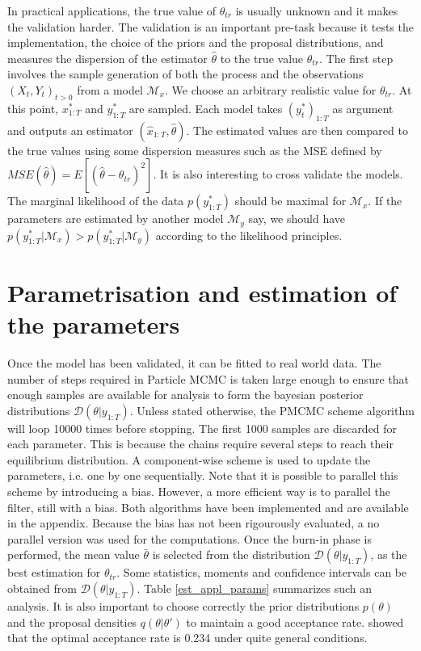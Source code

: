 \documentclass[11pt,a4,twosided,singlespacing,titlepagenumber=on]{scrreprt}
\numberwithin{equation}{chapter} %
\theoremstyle{remark}
\begin{document}
In practical applications, the true value of $\theta_{tr}$ is usually unknown and it makes the validation harder. The validation is an important pre-task because it tests the implementation, the choice of the priors and the proposal distributions, and measures the dispersion of the estimator $\hat{\theta}$ to the true value $\theta_{tr}$. The first step involves the sample generation of both the process and the observations $(X_t, Y_t)_{t > 0}$ from a model $\mathcal{M}_x$. We choose an arbitrary realistic value for $\theta_{tr}$. At this point, $x^*_{1:T}$ and $y^*_{1:T}$ are sampled. Each model takes $(y_t^*)_{1:T}$ as argument and outputs an estimator $(\hat{x}_{1:T}, \hat{\theta})$. The estimated values are then compared to the true values using some dispersion measures such as the MSE defined by $MSE(\hat{\theta}) = E[ ( \hat{\theta} - \theta_{tr} )^2 ]$. It is also interesting to cross validate the models. The marginal likelihood of the data $p(y^*_{1:T})$ should be maximal for $\mathcal{M}_x$. If the parameters are estimated by another model $\mathcal{M}_y$ say, we should have $p(y^*_{1:T} | \mathcal{M}_x) > p(y^*_{1:T} | \mathcal{M}_y)$ according to the likelihood principles.

\section{Parametrisation and estimation of the parameters}

Once the model has been validated, it can be fitted to real world data. The number of steps required in Particle MCMC is taken large enough to ensure that enough samples are available for analysis to form the bayesian posterior distributions $\mathcal{D}(\theta|y_{1:T})$. Unless stated otherwise, the PMCMC scheme algorithm will loop 10000 times before stopping. The first 1000 samples are discarded for each parameter. This is because the chains require several steps to reach their equilibrium distribution. A component-wise scheme is used to update the parameters, i.e. one by one sequentially. Note that it is possible to parallel this scheme by introducing a bias. However, a more efficient way is to parallel the filter, still with a bias. Both algorithms have been implemented and are available in the appendix. Because the bias has not been rigourously evaluated, a no parallel version was used for the computations. Once the burn-in phase is performed, the mean value $\bar{\theta}$ is selected from the distribution $\mathcal{D}(\theta|y_{1:T})$, as the best estimation for $\theta_{tr}$. Some statistics, moments and confidence intervals can be obtained from $\mathcal{D}(\theta|y_{1:T})$. Table \ref{est_appl_params} summarizes such an analysis. It is also important to choose correctly the prior distributions $p(\theta)$ and the proposal densities $q(\theta|\theta')$ to maintain a good acceptance rate. \cite{roberts1997} showed that the optimal acceptance rate is 0.234 under quite general conditions.
\end{document}
